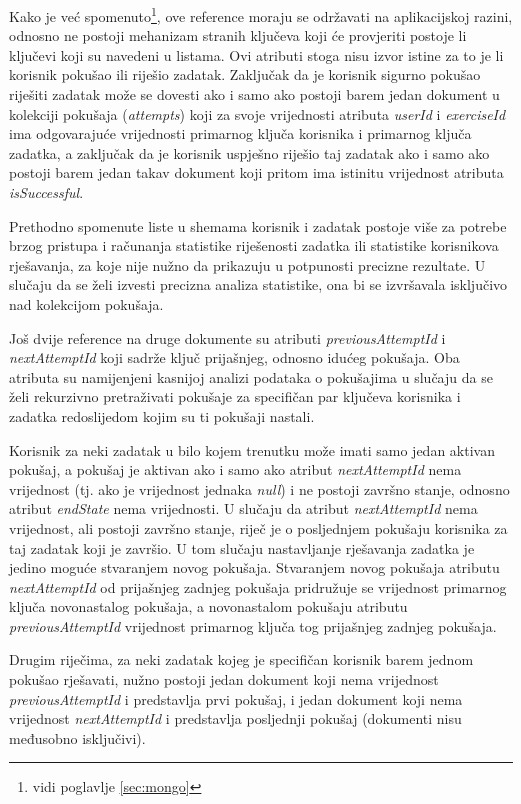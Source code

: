 \documentclass[times, utf8, diplomski, numeric]{fer}
\newcommand{\razmakp}{\vspace{18pt}}
\begin{document}
Kako je već spomenuto\footnote{vidi poglavlje \ref{sec:mongo}}, ove reference moraju se održavati na aplikacijskoj razini, odnosno ne postoji mehanizam stranih ključeva koji će provjeriti postoje li ključevi koji su navedeni u listama.
Ovi atributi stoga nisu izvor istine  za to je li korisnik pokušao ili riješio zadatak.
Zaključak da je korisnik sigurno pokušao riješiti zadatak može se dovesti ako i samo ako postoji barem jedan dokument u kolekciji pokušaja (\emph{attempts}) koji za svoje vrijednosti atributa \emph{userId} i \emph{exerciseId} ima odgovarajuće vrijednosti primarnog ključa korisnika i primarnog ključa zadatka, a zaključak da je korisnik uspješno riješio taj zadatak ako i samo ako postoji barem jedan takav dokument koji pritom ima istinitu vrijednost atributa \emph{isSuccessful}.

Prethodno spomenute liste u shemama korisnik i zadatak postoje više za potrebe brzog pristupa i računanja statistike riješenosti zadatka ili statistike korisnikova rješavanja, za koje nije nužno da prikazuju u potpunosti precizne rezultate.
U slučaju da se želi izvesti precizna analiza statistike, ona bi se izvršavala isključivo nad kolekcijom pokušaja.

\razmakp

Još dvije reference na druge dokumente su atributi \emph{previousAttemptId} i \emph{nextAttemptId} koji sadrže ključ prijašnjeg, odnosno idućeg pokušaja.
Oba atributa su namijenjeni kasnijoj analizi podataka o pokušajima u slučaju da se želi rekurzivno pretraživati pokušaje za specifičan par ključeva korisnika i zadatka redoslijedom kojim su ti pokušaji nastali.

Korisnik za neki zadatak u bilo kojem trenutku može imati samo jedan aktivan pokušaj, a pokušaj je aktivan ako i samo ako atribut \emph{nextAttemptId} nema vrijednost (tj. ako je vrijednost jednaka \emph{null}) i ne postoji završno stanje, odnosno atribut \emph{endState} nema vrijednosti.
U slučaju da atribut \emph{nextAttemptId} nema vrijednost, ali postoji završno stanje, riječ je o posljednjem pokušaju korisnika za taj zadatak koji je završio.
U tom slučaju nastavljanje rješavanja zadatka je jedino moguće stvaranjem novog pokušaja.
Stvaranjem novog pokušaja atributu \emph{nextAttemptId} od prijašnjeg zadnjeg pokušaja pridružuje se vrijednost primarnog ključa novonastalog pokušaja, a novonastalom pokušaju atributu \emph{previousAttemptId} vrijednost primarnog ključa tog prijašnjeg zadnjeg pokušaja.

Drugim riječima, za neki zadatak kojeg je specifičan korisnik barem jednom pokušao rješavati, nužno postoji jedan dokument koji nema vrijednost \emph{previousAttemptId} i predstavlja prvi pokušaj, i jedan dokument koji nema vrijednost \emph{nextAttemptId} i predstavlja posljednji pokušaj (dokumenti nisu međusobno isključivi).
\end{document}
